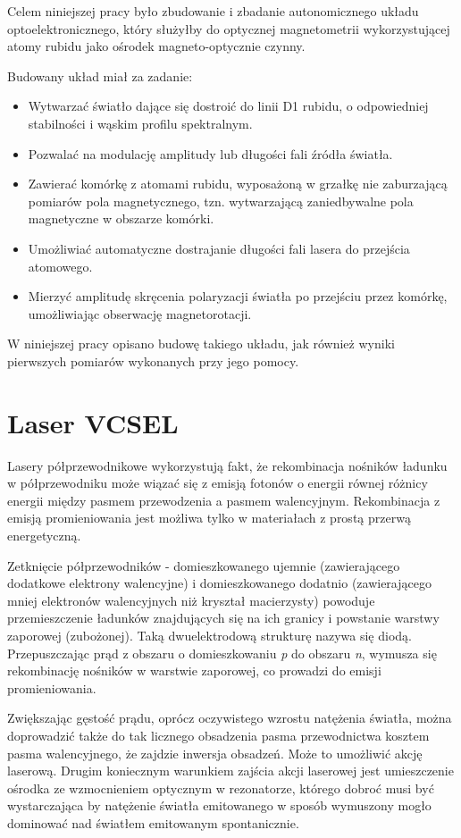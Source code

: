 \documentclass[a4paper,10pt,twoside]{report}
\begin{document}
Celem niniejszej pracy było zbudowanie i zbadanie autonomicznego układu optoelektronicznego, który służyłby do optycznej magnetometrii wykorzystującej atomy rubidu jako ośrodek magneto-optycznie czynny.

Budowany układ miał za zadanie:
\begin{itemize}
 \item Wytwarzać światło dające się dostroić do linii D1 rubidu, o odpowiedniej stabilności i wąskim profilu spektralnym.
 \item Pozwalać na modulację amplitudy lub długości fali źródła światła.
 \item Zawierać komórkę z atomami rubidu, wyposażoną w grzałkę nie zaburzającą pomiarów pola magnetycznego, tzn. wytwarzającą zaniedbywalne pola magnetyczne w obszarze komórki.
 \item Umożliwiać automatyczne dostrajanie długości fali lasera do przejścia atomowego. 
 \item Mierzyć amplitudę skręcenia polaryzacji światła po przejściu przez komórkę, umożliwiając obserwację magnetorotacji.
\end{itemize}

W niniejszej pracy opisano budowę takiego układu, jak również wyniki pierwszych pomiarów wykonanych przy jego pomocy.


\section{Laser VCSEL}


Lasery półprzewodnikowe wykorzystują fakt, że rekombinacja nośników ładunku w półprzewodniku może wiązać się z emisją fotonów o energii równej różnicy energii między pasmem przewodzenia a pasmem walencyjnym. Rekombinacja z emisją promieniowania jest możliwa tylko w materiałach z prostą przerwą energetyczną.


Zetknięcie półprzewodników - domieszkowanego ujemnie (zawierającego dodatkowe elektrony walencyjne) i domieszkowanego dodatnio (zawierającego mniej elektronów walencyjnych niż kryształ macierzysty) powoduje przemieszczenie ładunków znajdujących się na ich granicy i powstanie warstwy zaporowej (zubożonej). Taką dwuelektrodową strukturę nazywa się diodą. Przepuszczając prąd z obszaru o domieszkowaniu \textit{p} do obszaru \textit{n}, wymusza się rekombinację nośników w warstwie zaporowej, co prowadzi do emisji promieniowania.  

Zwiększając gęstość prądu, oprócz oczywistego wzrostu natężenia światła, można doprowadzić także do tak licznego obsadzenia pasma przewodnictwa kosztem pasma walencyjnego, że zajdzie inwersja obsadzeń. Może to umożliwić akcję laserową. Drugim koniecznym warunkiem zajścia akcji laserowej jest umieszczenie ośrodka ze wzmocnieniem optycznym w rezonatorze, którego dobroć musi być wystarczająca by natężenie światła emitowanego w sposób wymuszony mogło dominować nad światłem emitowanym spontanicznie.
\end{document}
